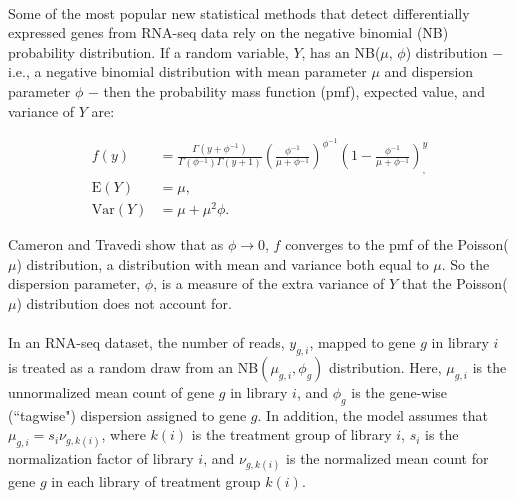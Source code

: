 \documentclass[10pt]{article}
\providecommand{\nv}{{}^{-1}}
\providecommand{\rt}{\rightarrow}
\begin{document}
\paragraph{} \indent Some of the most popular new statistical methods that detect differentially expressed genes from RNA-seq data rely on the negative binomial (NB) probability distribution. If a random variable, $Y$, has an NB($\mu$, $\phi$) distribution $-$ i.e., a negative binomial distribution with mean parameter $\mu$ and dispersion parameter $\phi$ $-$ then the probability mass function (pmf), expected value, and variance of $Y$ are:

\begin{align*}
f(y) &= \frac{\Gamma(y+ \phi \nv)}{\Gamma(\phi \nv) \Gamma(y + 1)} \left ( \frac{\phi \nv}{\mu + \phi \nv} \right ) ^{\phi \nv} \left ( 1 - \frac{\phi \nv}{\mu + \phi \nv} \right )^ {y}_, \\
\text{E}(Y) &= \mu, \\
\text{Var}(Y) &= \mu + \mu^2 \phi.
\end{align*}

Cameron and Travedi \cite{travedi} show that as $\phi \rt 0$, $f$ converges to the pmf of the Poisson($\mu$) distribution, a distribution with mean and variance both equal to $\mu$. So the dispersion parameter, $\phi$, is a measure of the extra variance of $Y$ that the Poisson($\mu$) distribution does not account for.

\paragraph{} \indent In an RNA-seq dataset, the number of reads, $y_{g, i}$, mapped to gene $g$ in library $i$ is treated as a random draw from an NB$(\mu_{g, i}, \phi_g)$ distribution. Here, $\mu_{g, i}$ is the unnormalized mean count of gene $g$ in library $i$, and $\phi_g$ is the gene-wise (``tagwise") dispersion assigned to gene $g$. In addition, the model assumes that $\mu_{g, i} = s_i \nu_{g, k(i)}$, where $k(i)$ is the treatment group of library $i$, $s_i$ is the normalization factor of library $i$, and $\nu_{g, k(i)}$ is the normalized mean count for gene $g$ in each library of treatment group $k(i)$.
\end{document}
